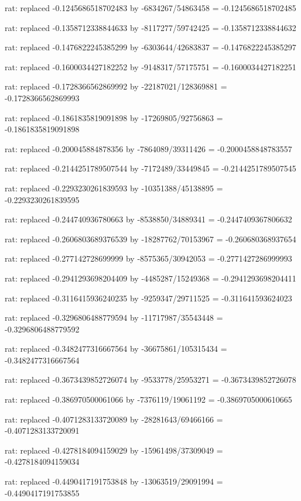 \documentclass[a4paper,10pt]{article}
\begin{document}
\begin{eulernotebook}
\begin{eulercomment}
\begin{eulercomment}
\begin{eulercomment}
\begin{eulercomment}
\begin{eulercomment}
\begin{eulercomment}
\begin{eulercomment}
\begin{eulercomment}
\begin{eulercomment}
\begin{eulercomment}
\begin{eulercomment}
\begin{eulercomment}
\begin{eulercomment}
\begin{eulercomment}
\begin{eulercomment}
\begin{eulercomment}
\begin{euleroutput}
  rat: replaced -0.1245686518702483 by -6834267/54863458 = -0.1245686518702485
  
  rat: replaced -0.1358712338844633 by -8117277/59742425 = -0.1358712338844632
  
  rat: replaced -0.1476822245385299 by -6303644/42683837 = -0.1476822245385297
  
  rat: replaced -0.1600034427182252 by -9148317/57175751 = -0.1600034427182251
  
  rat: replaced -0.1728366562869992 by -22187021/128369881 = -0.1728366562869993
  
  rat: replaced -0.1861835819091898 by -17269805/92756863 = -0.1861835819091898
  
  rat: replaced -0.200045884878356 by -7864089/39311426 = -0.2000458848783557
  
  rat: replaced -0.2144251789507544 by -7172489/33449845 = -0.2144251789507545
  
  rat: replaced -0.2293230261839593 by -10351388/45138895 = -0.2293230261839595
  
  rat: replaced -0.244740936780663 by -8538850/34889341 = -0.2447409367806632
  
  rat: replaced -0.2606803689376539 by -18287762/70153967 = -0.260680368937654
  
  rat: replaced -0.277142728699999 by -8575365/30942053 = -0.2771427286999993
  
  rat: replaced -0.2941293698204409 by -4485287/15249368 = -0.2941293698204411
  
  rat: replaced -0.3116415936240235 by -9259347/29711525 = -0.311641593624023
  
  rat: replaced -0.3296806488779594 by -11717987/35543448 = -0.3296806488779592
  
  rat: replaced -0.3482477316667564 by -36675861/105315434 = -0.3482477316667564
  
  rat: replaced -0.3673439852726074 by -9533778/25953271 = -0.3673439852726078
  
  rat: replaced -0.386970500061066 by -7376119/19061192 = -0.3869705000610665
  
  rat: replaced -0.4071283133720089 by -28281643/69466166 = -0.4071283133720091
  
  rat: replaced -0.4278184094159029 by -15961498/37309049 = -0.4278184094159034
  
  rat: replaced -0.4490417191753848 by -13063519/29091994 = -0.4490417191753855
  

\end{euleroutput}
\end{eulercomment}
\end{eulercomment}
\end{eulercomment}
\end{eulercomment}
\end{eulercomment}
\end{eulercomment}
\end{eulercomment}
\end{eulercomment}
\end{eulercomment}
\end{eulercomment}
\end{eulercomment}
\end{eulercomment}
\end{eulercomment}
\end{eulercomment}
\end{eulercomment}
\end{eulercomment}
\end{eulernotebook}
\end{document}
